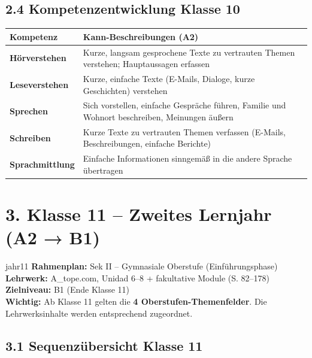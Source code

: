 \documentclass[11pt, a4paper]{article}
\begin{document}
\subsection*{2.4 Kompetenzentwicklung Klasse 10}

\begin{tabularx}{\textwidth}{|L{3cm}|X|}
\hline
{}
\textbf{Kompetenz} & \textbf{Kann-Beschreibungen (A2)} \\
\hline
\textbf{Hörverstehen} & Kurze, langsam gesprochene Texte zu vertrauten Themen verstehen; Hauptaussagen erfassen \\
\hline
\textbf{Leseverstehen} & Kurze, einfache Texte (E-Mails, Dialoge, kurze Geschichten) verstehen \\
\hline
\textbf{Sprechen} & Sich vorstellen, einfache Gespräche führen, Familie und Wohnort beschreiben, Meinungen äußern \\
\hline
\textbf{Schreiben} & Kurze Texte zu vertrauten Themen verfassen (E-Mails, Beschreibungen, einfache Berichte) \\
\hline
\textbf{Sprachmittlung} & Einfache Informationen sinngemäß in die andere Sprache übertragen \\
\hline
\end{tabularx}


\newpage
\section*{3. Klasse 11 -- Zweites Lernjahr (A2 → B1)}

\begin{jahrbox}{jahr11}
\textbf{Rahmenplan:} Sek II -- Gymnasiale Oberstufe (Einführungsphase)\\
\textbf{Lehrwerk:} A\_tope.com, Unidad 6--8 + fakultative Module (S. 82--178)\\
\textbf{Zielniveau:} B1 (Ende Klasse 11)\\[4pt]
\textbf{Wichtig:} Ab Klasse 11 gelten die \textbf{4 Oberstufen-Themenfelder}. Die Lehrwerksinhalte werden entsprechend zugeordnet.
\end{jahrbox}

\subsection*{3.1 Sequenzübersicht Klasse 11}
\end{document}
